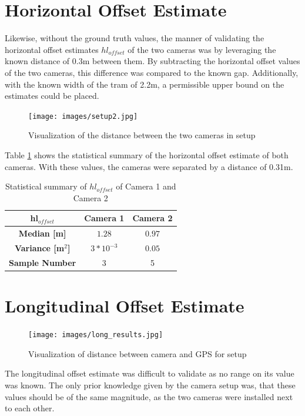 \section{Horizontal Offset Estimate}
Likewise, without the ground truth values, the manner of validating the horizontal offset estimates $hl_{offset}$  of the two cameras was by leveraging the known distance of 0.3m between them. By subtracting the horizontal offset values of the two cameras, this difference was compared to the known gap. Additionally, with the known width of the tram of 2.2m, a permissible upper bound on the estimates could be placed.
\begin{figure}[h!]
   \centering
   \texttt{[image: images/setup2.jpg]}
   \caption{Visualization of the distance between the two cameras in setup}
   \label{pics:setup2}
\end{figure}

Table \ref{tab:stats_hl_offset} shows the statistical summary of the horizontal offset estimate of both cameras. With these values, the cameras were separated by a distance of 0.31m. 

\begin{table}[h!]
\centering
\begin{tabular}{ccc}
\textbf{hl$_{offset}$}  & \textbf{Camera 1} & \textbf{Camera 2} \\
\midrule
\textbf{Median [m]} & $1.28$ & $0.97$ \\
\textbf{Variance [m$^2$]} &  $ 3 * 10^{-3}$ & $0.05$ \\
\textbf{Sample Number} & 3 & 5 \\
\bottomrule
\end{tabular}
\caption{Statistical summary of $hl_{offset}$ of Camera 1 and Camera 2}
\label{tab:stats_hl_offset}
\end{table}
\newpage







\section{Longitudinal Offset Estimate}

\begin{figure}[h!]
   \centering
   \texttt{[image: images/long\_results.jpg]}
   \caption{Visualization of distance between camera and GPS for setup}
   \label{pics:long_truth}
\end{figure}

The longitudinal offset estimate was difficult to validate as no range on its value was known. The only prior knowledge given by the camera setup was, that these values should be of the same magnitude, as the two cameras were installed next to each other.\\


